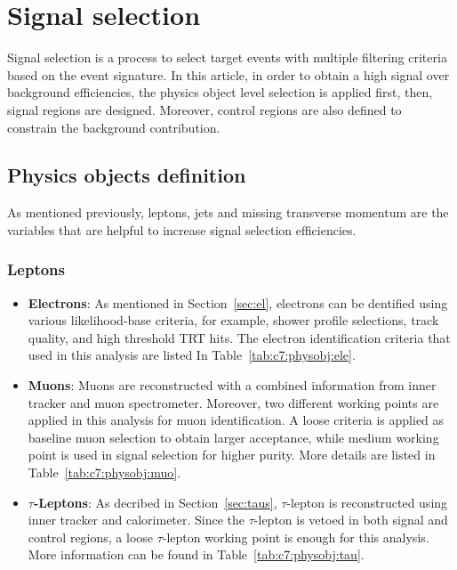 \chapter{Signal selection}

\label{ch:ana-sig}

\par Signal selection is a process to select target events with multiple filtering criteria based on the event signature. In this article, in order to obtain a high signal over background efficiencies, the physics object level selection is applied first, then, signal regions are designed. Moreover, control regions are also defined to constrain the background contribution.

\section{Physics objects definition}
\label{sec:ana-sig:physobj}

\par As mentioned previously, leptons, jets and missing transverse momentum are the variables that are helpful to increase signal selection efficiencies.

\subsection{Leptons}

\begin{itemize}
    \item \textbf{Electrons}: As mentioned in Section~\ref{sec:el}, electrons can be dentified using various likelihood-base criteria, for example, shower profile selections, track quality, and high threshold TRT hits. The electron identification criteria that used in this analysis are listed In Table~\ref{tab:c7:physobj:ele}.
    \item \textbf{Muons}: Muons are reconstructed with a combined information from inner tracker and muon spectrometer. Moreover, two different working points are applied in this analysis for muon identification. A loose criteria is applied as baseline muon selection to obtain larger acceptance, while medium working point is used in signal selection for higher purity. More details are listed in Table~\ref{tab:c7:physobj:muo}.
    \item \textbf{$\tau$-Leptons}: As decribed in Section~\ref{sec:taus}, $\tau$-lepton is reconstructed using inner tracker and calorimeter. Since the $\tau$-lepton is vetoed in both signal and control regions, a loose $\tau$-lepton working point is enough for this analysis. More information can be found in Table~\ref{tab:c7:physobj:tau}.
\end{itemize}

